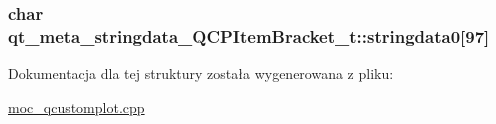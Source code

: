 \subsubsection[{\texorpdfstring{stringdata0}{stringdata0}}]{\setlength{\rightskip}{0pt plus 5cm}char qt\+\_\+meta\+\_\+stringdata\+\_\+\+Q\+C\+P\+Item\+Bracket\+\_\+t\+::stringdata0\mbox{[}97\mbox{]}}\hypertarget{structqt__meta__stringdata___q_c_p_item_bracket__t_a69c4efac85336d82d66b351f29e79864}{}\label{structqt__meta__stringdata___q_c_p_item_bracket__t_a69c4efac85336d82d66b351f29e79864}


Dokumentacja dla tej struktury została wygenerowana z pliku\+:\begin{DoxyCompactItemize}
\item 
\hyperlink{moc__qcustomplot_8cpp}{moc\+\_\+qcustomplot.\+cpp}\end{DoxyCompactItemize}
